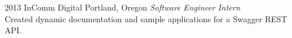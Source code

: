 \documentclass[]{friggeri-cv} %
\begin{document}
\begin{entrylist}

%
%

\entry
{2013}
{InComm Digital}
{Portland, Oregon}
{\emph{Software Engineer Intern} \\
Created dynamic documentation and sample applications for a Swagger REST API.}


\end{entrylist}

\end{document}
